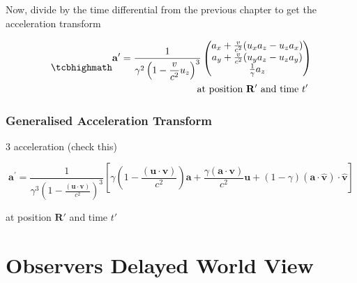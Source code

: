 Now, divide by the time differential from the previous chapter to get the acceleration transform

\begin{equation}
	\mhl{
		\begin{aligned}
			\mathbf{a}' = \dfrac{1}{\gamma^2\left(1- \dfrac{v}{c^2} u_z\right)^3 }
			\begin{pmatrix}
				a_x + \frac{v}{c^2}(u_x a_z - u_z a_x) \\
				a_y + \frac{v}{c^2}(u_y a_z - u_z a_y) \\
				\frac{1}{\gamma} a_z                   \\
			\end{pmatrix}
			\\
			\text{at position $\mathbf{R}'$ and time $t'$ }
		\end{aligned}
	}
\end{equation}

\subsection{Generalised Acceleration Transform}

3 acceleration (check this)

\begin{equation}
	\mathbf{a^{'}} = \frac{1}{\gamma ^3 \left(1-\frac{(\mathbf{u}\cdot \mathbf{v})}{c^2}\right)^3}\left[ \gamma \left(1-\frac{(\mathbf{u}\cdot\mathbf{v})}{c^2}\right)\mathbf{a}+\frac{\gamma (\mathbf{a}\cdot\mathbf{v})}{c^2}\mathbf{u} + (1-\gamma ) (\mathbf{a}\cdot\hat{\mathbf{v}}) \cdot\hat{\mathbf{v}}\right]
\end{equation}

at position $\mathbf{R}'$ and time $t'$



\chapter{Observers Delayed World View}

